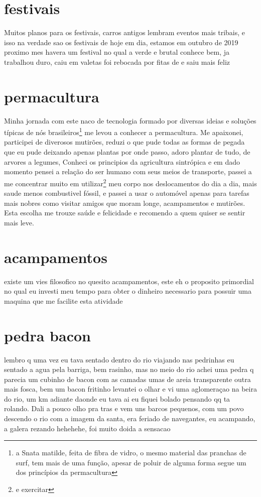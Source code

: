 \documentclass[a4paper]{report}
\begin{document}


\section*{festivais}
	Muitos planos para os festivais, carros antigos lembram eventos mais tribais, e isso na verdade sao os festivais de hoje em dia, 
        estamos em outubro de 2019 proximo mes havera um festival no qual a verde e brutal conhece bem, ja trabalhou duro, caiu em valetas
        foi rebocada por fitas de e saiu mais feliz 

\section*{permacultura}
	Minha jornada com este naco de tecnologia formado por diversas ideias e solu\c{c}\~oes t\'ipicas de n\'os brasileiros\footnote{ a Snata matilde, feita de fibra de vidro, o mesmo material das pranchas de surf, tem mais de uma fun\c{c}\~ao, apesar de poluir de alguma forma segue um dos princ\'ipios da permacultura } me levou a conhecer a permacultura.
 	Me apaixonei, participei de diverosos mutir\~oes, reduzi o que pude todas as formas de pegada que eu pude deixando apenas plantas por onde passo, adoro plantar de tudo, de arvores a legumes,
        Conheci os principios da agricultura sintr\'opica e em dado momento pensei a rela\c{c}\~ao do ser humano com seus meios de transporte, passei a me concentrar muito em utilizar\footnote{e exercitar} meu corpo nos deslocamentos do dia a dia, mais saude menos combustivel f\'ossil, e passei a usar o autom\'ovel apenas para tarefas mais nobres como visitar amigos que moram longe, acampamentos e mutir\~oes.
	Esta escolha me trouxe sa\'ude e felicidade e recomendo a quem quiser se sentir mais leve. 


\section*{acampamentos}
	existe um vies filosofico no quesito acampamentos, este eh o proposito primordial no qual eu investi meu tempo para obter o dinheiro necessario para possuir uma maquina que me facilite esta atividade


\section*{pedra bacon}

 lembro q uma vez eu tava sentado dentro do rio viajando nas pedrinhas eu sentado a agua pela barriga, bem rasinho, mas no meio do rio
 achei uma pedra q parecia um cubinho de bacon  com as camadas umas de areia transparente outra mais fosca, bem um bacon fritinho
 levantei o olhar e vi uma aglomeraçao na beira do rio, um km adiante daonde eu tava
 ai eu fiquei bolado pensando qq ta rolando.  Dali a pouco olho pra tras e vem uns barcos pequenos, com um povo descendo o rio
 com a imagem da santa, era feriado de navegantes,  eu acampando,  a galera rezando hehehehe,  foi muito doida a sensacao
\end{document}
